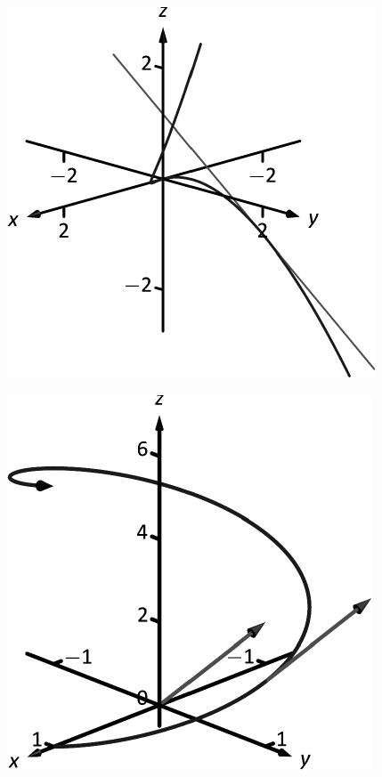 \documentclass[10pt]{article}
\begin{document}
\includegraphics{figvvfderiv1_3DBW.pdf}
\texttt{}

\includegraphics{figvvflimit4_3DBW.pdf}
\texttt{}
\end{document}
